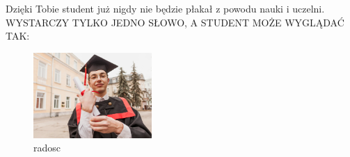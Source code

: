 Dzięki Tobie student już nigdy nie będzie płakał z powodu nauki i uczelni.
{{\Large WYSTARCZY TYLKO JEDNO SŁOWO, A STUDENT MOŻE WYGLĄDAĆ TAK:}}

\begin{figure}[htbp]
    \centering
    \includegraphics[width=0.4\textwidth]{pictures/zadowolony-student.jpg}
    \caption{radosc}
    \label{fig:radosc}
\end{figure}
